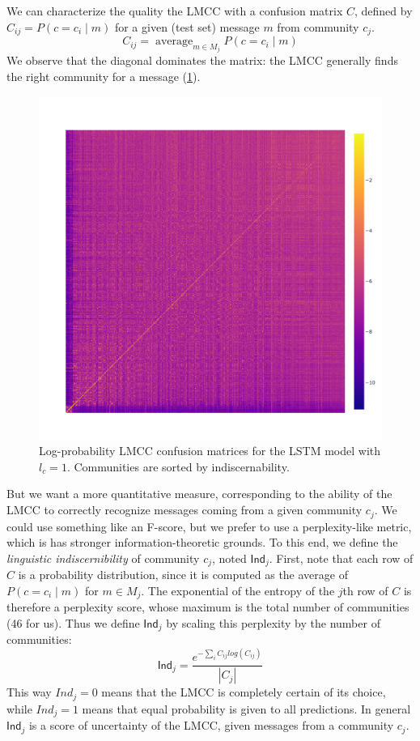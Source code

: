 \documentclass[11pt]{article}
\newcommand\Ind{\mathsf{Ind}}
\DeclareMathOperator*{\avg}{average}
\begin{document}
We can characterize the quality the LMCC with a confusion matrix
$C$, defined by $C_{ij} = P(c=c_i \mid m)$ for a given (test set) message $m$ 
from community $c_j$.
\[C_{ij} = \avg_{m\in M_j}P(c=c_i \mid m)\]
We observe that the diagonal dominates the matrix: the LMCC generally finds the right community for a message (\cref{fig:confusion}).

\begin{figure}
  \includegraphics[width=\linewidth]{floats/confusion_lstm-3-1}
\caption{
  Log-probability LMCC confusion matrices for the LSTM model with $l_c=1$. 
  Communities are sorted by indiscernability.}
\label{fig:confusion}
\end{figure}


But we want a more quantitative measure, corresponding to the ability of the LMCC to correctly
recognize messages coming from a given community $c_j$. We could use
something like an F-score, but we prefer to use a perplexity-like metric,
which is has stronger information-theoretic grounds.
To this end, we define the \emph{linguistic indiscernibility} of community $c_j$, 
noted $\Ind_j$. 
First, note that each row of $C$ is a probability distribution,
since it is computed as the average of $P(c=c_i \mid m)$ for $m\in M_j$.
The exponential of the entropy of the $j$th row of \(C\) is therefore a perplexity score,
whose maximum is the total number of communities (46 for us).
Thus we define $\Ind_j$ by scaling this perplexity by the number of communities:
\[\Ind_j = \frac{e^{-\sum_i C_{ij} log(C_{ij})}}{|C_j|}\]
This way $Ind_j=0$ means that the LMCC is completely certain of its
choice, while $Ind_j=1$ means that equal probability is given to all
predictions.  In general $\Ind_j$ is a score of uncertainty of the
LMCC, given messages from a community $c_j$.
\end{document}

